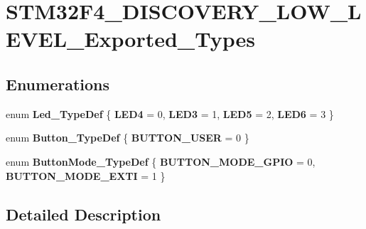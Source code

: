 \hypertarget{group___s_t_m32_f4___d_i_s_c_o_v_e_r_y___l_o_w___l_e_v_e_l___exported___types}{\section{S\-T\-M32\-F4\-\_\-\-D\-I\-S\-C\-O\-V\-E\-R\-Y\-\_\-\-L\-O\-W\-\_\-\-L\-E\-V\-E\-L\-\_\-\-Exported\-\_\-\-Types}
\label{group___s_t_m32_f4___d_i_s_c_o_v_e_r_y___l_o_w___l_e_v_e_l___exported___types}
}
\subsection*{Enumerations}
\begin{DoxyCompactItemize}
\item 
enum {\bfseries Led\-\_\-\-Type\-Def} \{ {\bfseries L\-E\-D4} = 0, 
{\bfseries L\-E\-D3} = 1, 
{\bfseries L\-E\-D5} = 2, 
{\bfseries L\-E\-D6} = 3
 \}
\item 
enum {\bfseries Button\-\_\-\-Type\-Def} \{ {\bfseries B\-U\-T\-T\-O\-N\-\_\-\-U\-S\-E\-R} = 0
 \}
\item 
enum {\bfseries Button\-Mode\-\_\-\-Type\-Def} \{ {\bfseries B\-U\-T\-T\-O\-N\-\_\-\-M\-O\-D\-E\-\_\-\-G\-P\-I\-O} = 0, 
{\bfseries B\-U\-T\-T\-O\-N\-\_\-\-M\-O\-D\-E\-\_\-\-E\-X\-T\-I} = 1
 \}
\end{DoxyCompactItemize}


\subsection{Detailed Description}
